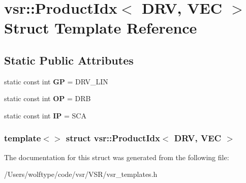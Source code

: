 \hypertarget{structvsr_1_1_product_idx_3_01_d_r_v_00_01_v_e_c_01_4}{\section{vsr\-:\-:Product\-Idx$<$ D\-R\-V, V\-E\-C $>$ Struct Template Reference}
\label{structvsr_1_1_product_idx_3_01_d_r_v_00_01_v_e_c_01_4}
}
\subsection*{Static Public Attributes}
\begin{DoxyCompactItemize}
\item 
\hypertarget{structvsr_1_1_product_idx_3_01_d_r_v_00_01_v_e_c_01_4_a06176d9a27d3270818b9f09b919e972d}{static const int {\bfseries G\-P} = D\-R\-V\-\_\-\-L\-I\-N}\label{structvsr_1_1_product_idx_3_01_d_r_v_00_01_v_e_c_01_4_a06176d9a27d3270818b9f09b919e972d}

\item 
\hypertarget{structvsr_1_1_product_idx_3_01_d_r_v_00_01_v_e_c_01_4_a27c4a1d94f74fb2c0b448a538df02b91}{static const int {\bfseries O\-P} = D\-R\-B}\label{structvsr_1_1_product_idx_3_01_d_r_v_00_01_v_e_c_01_4_a27c4a1d94f74fb2c0b448a538df02b91}

\item 
\hypertarget{structvsr_1_1_product_idx_3_01_d_r_v_00_01_v_e_c_01_4_a09f33da18d58703e399a587b5d13373d}{static const int {\bfseries I\-P} = S\-C\-A}\label{structvsr_1_1_product_idx_3_01_d_r_v_00_01_v_e_c_01_4_a09f33da18d58703e399a587b5d13373d}

\end{DoxyCompactItemize}
\subsubsection*{template$<$$>$ struct vsr\-::\-Product\-Idx$<$ D\-R\-V, V\-E\-C $>$}



The documentation for this struct was generated from the following file\-:\begin{DoxyCompactItemize}
\item 
/\-Users/wolftype/code/vsr/\-V\-S\-R/vsr\-\_\-templates.\-h\end{DoxyCompactItemize}
